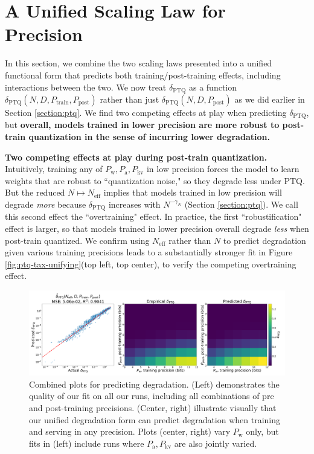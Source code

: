 \documentclass[11pt]{article}
\begin{document}
\section{A Unified Scaling Law for Precision}\label{section:unifying}

In this section, we combine the two scaling laws presented into a unified functional form that predicts both training/post-training effects, including interactions between the two. We now treat $\delta_\text{PTQ}$ as a function $\delta_\text{PTQ}(N, D, P_\text{train}, P_\text{post})$ rather than just $\delta_\text{PTQ}(N, D, P_\text{post})$ as we did earlier in Section \ref{section:ptq}. We find two competing effects at play when predicting $\delta_\text{PTQ}$, but \textbf{overall, models trained in lower precision are more robust to post-train quantization in the sense of incurring lower degradation. }

\textbf{Two competing effects at play during post-train quantization.} Intuitively, training any of $P_\text{w}, P_\text{a}, P_\text{kv}$ in low precision forces the model to learn weights that are robust to ``quantization noise," so they degrade less under PTQ. But the reduced $N \mapsto N_\text{eff}$ implies that models trained in low precision will degrade \textit{more} because $\delta_\text{PTQ}$ increases with $N^{-\gamma_N}$ (Section \ref{section:ptq}). We call this second effect the ``overtraining" effect. In practice, the first ``robustification" effect is larger, so that models trained in lower precision overall degrade \textit{less} when post-train quantized. We confirm using $N_\text{eff}$ rather than $N$ to predict degradation given various training precisions leads to a substantially stronger fit in Figure \ref{fig:ptq-tax-unifying}(top left, top center), to verify the competing overtraining effect. 

    \begin{figure}
        \centering
        \includegraphics[width=\linewidth]{combined_plots_new_evals.pdf}  %
    \caption{Combined plots for predicting degradation. (Left) demonstrates the quality of our fit on all our runs, including all combinations of pre and post-training precisions. (Center, right) illustrate visually that our unified degradation form can predict degradation when training and serving in any precision. Plots (center, right) vary $P_\text{w}$ only, but fits in (left) include runs where $P_\text{a}, P_\text{kv}$ are also jointly varied. 
    }
    \label{fig:ptq-tax-unifying-main}
    \end{figure}
\end{document}
